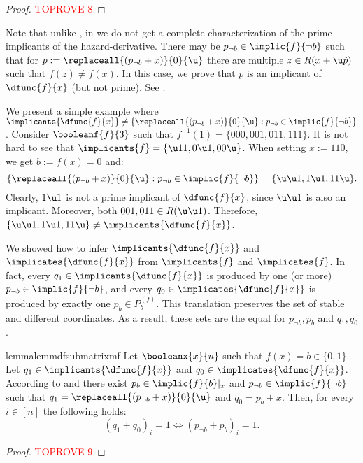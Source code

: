 \documentclass[acmsmall, nonacm, authorversion]{acmart}
\begin{document}
\begin{proof}\textcolor{red}{TOPROVE 8}\end{proof}

\begin{remark}
Note that unlike , in  we do not get a complete characterization of the prime implicants of the hazard-derivative. There may be $p_{\neg b}\in\implic{f}{\neg b}$ such that for $p:=\replaceall{(p_{\neg b}+x)}{0}{\u}$ there are multiple $z\in R(x+\u\check{p})$ such that $f(z)\neq f(x)$. In this case, we prove that $p$ is an implicant of $\dfunc{f}{x}$ (but not prime). See .
\end{remark}

\begin{example}\label{ex:prime-implicants-df} 
We present a simple example where $\implicants{\dfunc{f}{x}}\neq \{\replaceall{(p_{\neg b} + x)}{0}{\u} : \text{$p_{\neg b}\in \implic{f}{\neg b}$}\}$.  
Consider $\booleanf{f}{3}$ such that $f^{-1}(1)=\{000,001,011,111\}$. It is not hard to see that $\implicants{f}=\{\u 11,0 \u 1,00 \u\}$. When setting $x:=110$, we get $b:=f(x)=0$ and:
\[
\{\replaceall{(p_{\neg b} + x)}{0}{\u} : \text{$p_{\neg b}\in \implic{f}{\neg b}$}\} =\{\u\u 1,1 \u 1,11 \u\}.
\]
Clearly, $1 \u 1$ is not a prime implicant of $\dfunc{f}{x}$, since $\u\u 1$ is also an implicant. Moreover, both $001,011\in R(\u\u 1)$. Therefore, $\{\u\u 1,1 \u 1,11 \u\}\neq \implicants{\dfunc{f}{x}}$.
\end{example}

We showed how to infer $\implicants{\dfunc{f}{x}}$ and $\implicates{\dfunc{f}{x}}$ from $\implicants{f}$ and $\implicates{f}$. In fact, every $q_1\in \implicants{\dfunc{f}{x}}$ is produced by one (or more) $p_{\neg b}\in \implic{f}{\neg b}$, and every $q_0\in \implicates{\dfunc{f}{x}}$ is produced by exactly one $p_b\in P_b^{(f)}$. 
This translation preserves the set of stable and different coordinates. As a result, these sets are the equal for $p_{\neg b},p_b$ and $q_1,q_0$.

\begin{restatable}{lemma}{lemmdfsubmatrixmf}\label{lem:mdf-submatrix-mf} 
Let $\booleanx{x}{n}$ such that $f(x)=b\in\{0,1\}$. Let $q_1\in\implicants{\dfunc{f}{x}}$ and $q_0\in\implicates{\dfunc{f}{x}}$. According to  and  there exist $p_b\in\implic{f}{b}|_x$ and $p_{\neg b} \in \implic{f}{\neg b}$ such that $q_1=\replaceall{(p_{\neg b}+x)}{0}{\u}$ and $q_0=p_b+x$.
Then, for every $i\in [n]$ the following holds:
\[
(q_1+q_0)_i=1 \iff (p_{\neg b}+p_b)_i=1.
\]
\end{restatable}
\begin{proof}\textcolor{red}{TOPROVE 9}\end{proof}
\end{document}
